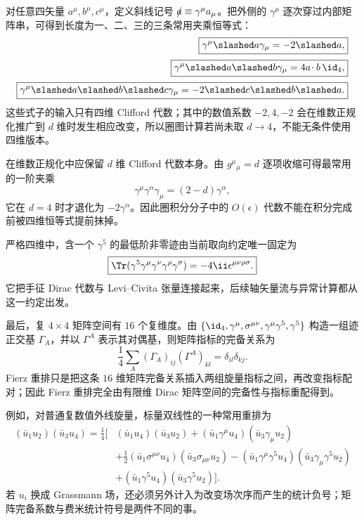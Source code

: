 对任意四矢量 $a^\mu,b^\mu,c^\mu$，定义斜线记号 $\slashed a\equiv\gamma^\mu a_\mu$。把外侧的 $\gamma^\mu$ 逐次穿过内部矩阵串，可得到长度为一、二、三的三条常用夹乘恒等式：
\begin{align}
 \boxed{\gamma^\mu\slashed a\gamma_\mu=-2\slashed a,}
 \label{eq:gamma-one-sandwich-r10}\\[2pt]
 \boxed{\gamma^\mu\slashed a\slashed b\gamma_\mu
 =4a\!\cdot b\,\id_4,}
 \label{eq:gamma-two-sandwich-r10}\\[2pt]
 \boxed{\gamma^\mu\slashed a\slashed b\slashed c\gamma_\mu
 =-2\slashed c\slashed b\slashed a.}
 \label{eq:gamma-three-sandwich-r10}
\end{align}
这些式子的输入只有四维 Clifford 代数；其中的数值系数 $-2,4,-2$ 会在维数正规化推广到 $d$ 维时发生相应改变，所以圈图计算若尚未取 $d\to4$，不能无条件使用四维版本。


在维数正规化中应保留 $d$ 维 Clifford 代数本身。由 $g^\mu{}_{\mu}=d$ 逐项收缩可得最常用的一阶夹乘
\begin{equation}
 \boxed{\gamma^\mu\gamma^\alpha\gamma_\mu=(2-d)\gamma^\alpha,}
 \label{eq:gamma-d-sandwich-r68}
\end{equation}
它在 $d=4$ 时才退化为 $-2\gamma^\alpha$。因此圈积分分子中的 $O(\epsilon)$ 代数不能在积分完成前被四维恒等式提前抹掉。

严格四维中，含一个 $\gamma^5$ 的最低阶非零迹由当前取向约定唯一固定为
\begin{equation}
 \boxed{\Tr(\gamma^5\gamma^\mu\gamma^\nu\gamma^\rho\gamma^\sigma)
 =-4\ii\epsilon^{\mu\nu\rho\sigma}.}
 \label{eq:gamma5-four-trace-r68}
\end{equation}
它把手征 Dirac 代数与 Levi--Civita 张量连接起来，后续轴矢量流与异常计算都从这一约定出发。

最后，复 $4\times4$ 矩阵空间有 $16$ 个复维度。由
$\{\id_4,\gamma^\mu,\sigma^{\mu\nu},\gamma^\mu\gamma^5,\gamma^5\}$
构造一组迹正交基 $\Gamma_A$，并以 $\Gamma^A$ 表示其对偶基，则矩阵指标的完备关系为
\begin{equation}
 \boxed{
 \frac14\sum_A
 (\Gamma_A)_{ij}(\Gamma^A)_{kl}
 =\delta_{il}\delta_{kj}.}
 \label{eq:dirac-matrix-completeness-r10}
\end{equation}
Fierz 重排只是把这条 $16$ 维矩阵完备关系插入两组旋量指标之间，再改变指标配对；因此 Fierz 重排完全由有限维 Dirac 矩阵空间的完备性与指标重配得到。


例如，对普通复数值外线旋量，标量双线性的一种常用重排为
\begin{align}
 (\bar u_1u_2)(\bar u_3u_4)
 =\frac14\Big[&
 (\bar u_1u_4)(\bar u_3u_2)
 +(\bar u_1\gamma^\mu u_4)(\bar u_3\gamma_\mu u_2)
 \nonumber\\
 &+\frac12(\bar u_1\sigma^{\mu\nu}u_4)(\bar u_3\sigma_{\mu\nu}u_2)
 -(\bar u_1\gamma^\mu\gamma^5u_4)(\bar u_3\gamma_\mu\gamma^5u_2)
 \nonumber\\
 &+(\bar u_1\gamma^5u_4)(\bar u_3\gamma^5u_2)\Big].
 \label{eq:fierz-scalar-r68}
\end{align}
若 $u_i$ 换成 Grassmann 场，还必须另外计入为改变场次序而产生的统计负号；矩阵完备系数与费米统计符号是两件不同的事。

